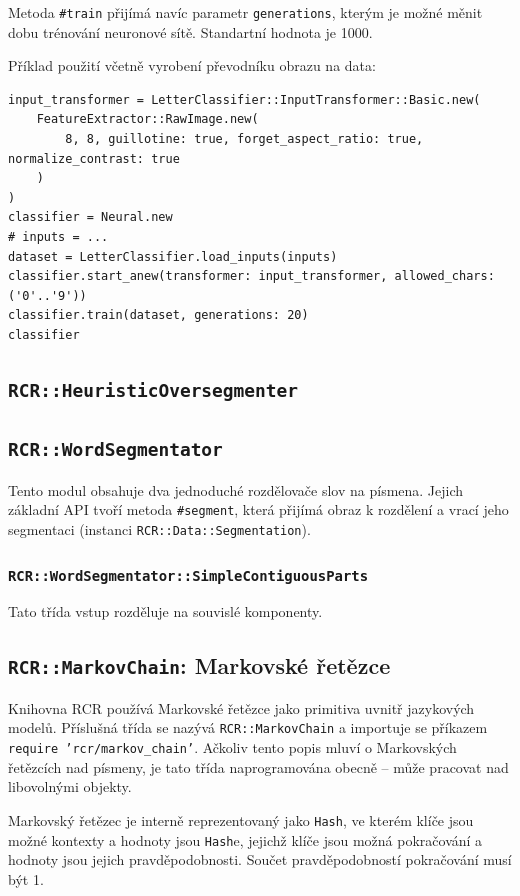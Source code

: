 \documentclass[a4paper]{article}
\begin{document}
Metoda \texttt{\#train} přijímá navíc parametr \texttt{generations},
kterým je možné měnit dobu trénování neuronové sítě. Standartní hodnota
je 1000.

Příklad použití včetně vyrobení převodníku obrazu na data:
\begin{lstlisting}
input_transformer = LetterClassifier::InputTransformer::Basic.new(
	FeatureExtractor::RawImage.new(
		8, 8, guillotine: true, forget_aspect_ratio: true, normalize_contrast: true
	)
)
classifier = Neural.new
# inputs = ...
dataset = LetterClassifier.load_inputs(inputs)
classifier.start_anew(transformer: input_transformer, allowed_chars: ('0'..'9'))
classifier.train(dataset, generations: 20)
classifier
\end{lstlisting}

\subsection{\texttt{RCR::HeuristicOversegmenter}}

\subsection{\texttt{RCR::WordSegmentator}}
Tento modul obsahuje dva jednoduché rozdělovače slov na písmena.
Jejich základní API tvoří metoda \texttt{\#segment}, která přijímá obraz k
rozdělení a vrací jeho segmentaci (instanci \texttt{RCR::Data::Segmentation}).

\subsubsection{\texttt{RCR::WordSegmentator::SimpleContiguousParts}}
Tato třída vstup rozděluje na souvislé komponenty.

\subsection{\texttt{RCR::MarkovChain}: Markovské řetězce}
Knihovna RCR používá Markovské řetězce jako primitiva uvnitř jazykových modelů.
Příslušná třída se nazývá \texttt{RCR::MarkovChain} a importuje se příkazem
\texttt{require 'rcr/markov\_chain'}. Ačkoliv tento popis mluví o Markovských
řetězcích nad písmeny, je tato třída naprogramována obecně -- může pracovat nad
libovolnými objekty.

Markovský řetězec je interně reprezentovaný jako \texttt{Hash}, ve kterém klíče
jsou možné kontexty a hodnoty jsou \texttt{Hash}e, jejichž klíče jsou možná
pokračování a hodnoty jsou jejich pravděpodobnosti. Součet pravděpodobností
pokračování musí být 1.
\end{document}
